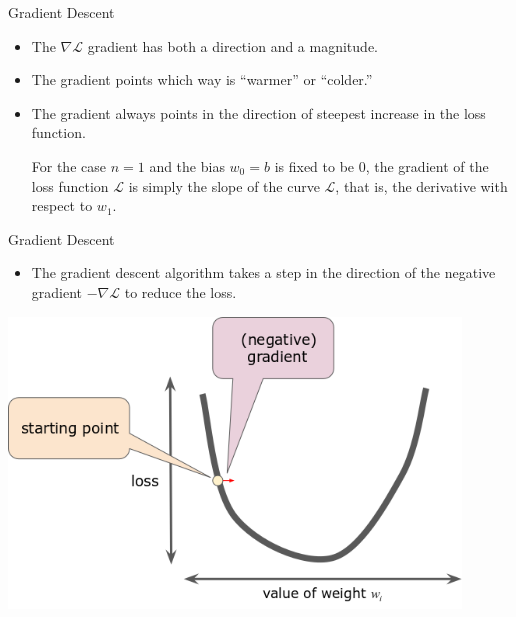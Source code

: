 \documentclass{beamer}
\begin{document}
\begin{frame}{Gradient Descent}
\begin{itemize}
\medskip    
\item The $\nabla\mathcal{L}$ gradient has both a direction and a magnitude.

\medskip    
\item The gradient points which way is ``warmer'' or ``colder.'' 

\medskip
\item The gradient always points in the direction of steepest increase in the loss function. 

\medskip 
\medskip For the case $n=1$ and the bias $w_0=b$ is fixed to be $0$, the gradient of the loss function $\mathcal{L}$ is simply the slope of the curve $\mathcal{L}$, that is, the derivative with respect to $w_1$.
\end{itemize}
\end{frame}



\begin{frame}{Gradient Descent}
\begin{itemize}
\item The gradient descent algorithm takes a step in the direction of the negative gradient $-\nabla \mathcal{L}$ to reduce the loss.
\end{itemize}

\vspace{0.1cm}
\includegraphics[width=0.9\textwidth]{images/GradientDescentNegativeGradient.png}
\end{frame}

\end{document}
